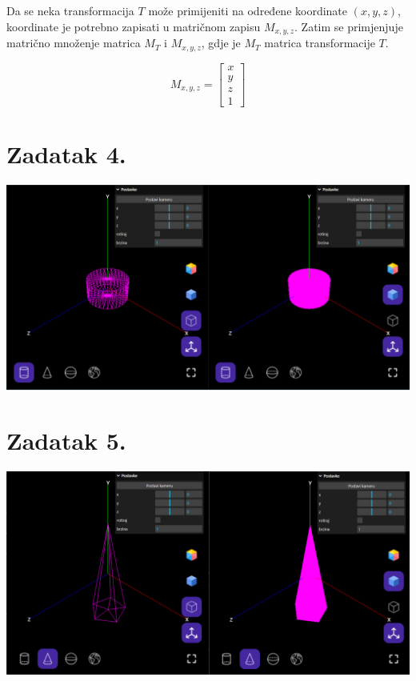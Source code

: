 \documentclass[a4paper,12pt]{article}
\begin{document}
\pagebreak

Da se neka transformacija $T$ može primijeniti na određene koordinate $(x, y, z)$, koordinate je
potrebno zapisati u matričnom zapisu $M_{x,y,z}$. Zatim se primjenjuje matrično množenje
matrica $M_T$ i $M_{x,y,z}$, gdje je $M_T$ matrica transformacije $T$.

\[
M_{x,y,z}=
\begin{bmatrix}
    x \\
    y \\
    z \\
    1
\end{bmatrix}
\]
\pagebreak

\section{Zadatak 4.}

\includegraphics[scale=0.5]{image/zadatak4.png}

\pagebreak

\section{Zadatak 5.}

\includegraphics[scale=0.5]{image/zadatak5.png}
\end{document}
